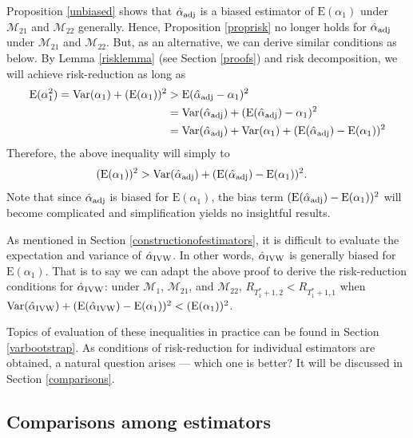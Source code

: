 \documentclass[11pt]{article}
\def\mc#1{\mathcal{#1}} %
\def\E#1{\mathrm{E}(#1)} %
\def\var#1{\mathrm{Var}(#1)} %
\theoremstyle{definition}
\begin{document}
Proposition \ref{unbiased} shows that $\hat{\alpha}_{\rm adj}$ is a biased estimator of $\E{\alpha_1}$ under $\mc{M}_{21}$ and $\mc{M}_{22}$ generally. Hence, Proposition \ref{proprisk} no longer  holds for $\hat{\alpha}_{\rm adj}$ under $\mc{M}_{21}$ and $\mc{M}_{22}$. But, as an alternative, we can derive similar conditions as below. By Lemma \ref{risklemma} (see Section \ref{proofs}) and risk decomposition, we will achieve risk-reduction as long as
\begin{align*}
 \E{\alpha_1^2}= \var{\alpha_1}+(\E{\alpha_1})^2
 &>\E{\hat{\alpha}_{\rm adj}-\alpha_1}^2\\
  &=\var{\hat{\alpha}_{\rm adj}} +  (\E{\hat{\alpha}_{\rm adj}}-\alpha_1)^2 \\
  &=\var{\hat{\alpha}_{\rm adj}} +  \var{\alpha_1} + (\E{\hat{\alpha}_{\rm adj}}-\E{\alpha_1})^2
\end{align*}
Therefore, the above inequality will simply to 
\begin{align*}
 (\E{\alpha_1})^2
 &>\var{\hat{\alpha}_{\rm adj}}+ (\E{\hat{\alpha}_{\rm adj}}-\E{\alpha_1})^2.
\end{align*}
Note that since $\hat{\alpha}_{\rm adj}$ is biased for $\E{\alpha_1}$, the bias term $(\E{\hat{\alpha}_{\rm adj}}-\E{\alpha_1})^2$ will become complicated and  simplification yields no insightful results. 

As mentioned in Section \ref{constructionofestimators}, it is difficult to evaluate the expectation and variance of $\hat{\alpha}_{\rm IVW}$. In other words, $\hat{\alpha}_{\rm IVW}$ is generally biased for $\E{\alpha_1}$. That is to say we can adapt the above proof to derive the risk-reduction conditions for $\hat{\alpha}_{\rm IVW}$: under $\mc{M}_{1}$, $\mc{M}_{21}$, and $\mc{M}_{22}$, $R_{T_1^*+1,2}<R_{T_1^*+1,1}$ when $\var{\hat{\alpha}_{\rm IVW}} +(\E{\hat{\alpha}_{\rm IVW}}-\E{\alpha_1})^2<(\E{\alpha_1})^2$.

Topics of  evaluation of these inequalities in practice can be found in Section \ref{varbootstrap}. As conditions of risk-reduction for individual estimators are obtained, a natural question arises --- which one is better? It will be discussed in Section \ref{comparisons}.



 

\subsection{Comparisons among estimators}
\end{document}
